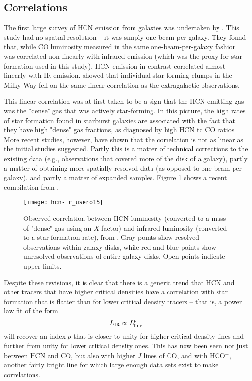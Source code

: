\subsection{Correlations}

The first large survey of HCN emission from galaxies was undertaken by \citet{gao04b, gao04a}. This study had no spatial resolution -- it was simply one beam per galaxy. They found that, while CO luminosity measured in the same one-beam-per-galaxy fashion was correlated non-linearly with infrared emission (which was the proxy for star formation used in this study), HCN emission in contrast correlated almost linearly with IR emission. \citet{wu05a} showed that individual star-forming clumps in the Milky Way fell on the same linear correlation as the extragalactic observations.

This linear correlation was at first taken to be a sign that the HCN-emitting gas was the "dense" gas that was actively star-forming. In this picture, the high rates of star formation found in starburst galaxies are associated with the fact that they have high "dense" gas fractions, as diagnosed by high HCN to CO ratios. More recent studies, however, have shown that the correlation is not as linear as the initial studies suggested. Partly this is a matter of technical corrections to the existing data (e.g., observations that covered more of the disk of a galaxy), partly a matter of obtaining more spatially-resolved data (as opposed to one beam per galaxy), and partly a matter of expanded samples. Figure \ref{fig:hcn-ir} shows a recent compilation from \citet{usero15a}.

\begin{figure}
\texttt{[image: hcn-ir\_usero15]}
\caption[Infrared-HCN luminosity correlation]{
\label{fig:hcn-ir}
Observed correlation between HCN luminosity (converted to a mass of "dense" gas using an $X$ factor) and infrared luminosity (converted to a star formation rate), from \citet{usero15a}. Gray points show resolved observations within galaxy disks, while red and blue points show unresolved observations of entire galaxy disks. Open points indicate upper limits.
}
\end{figure}

Despite these revisions, it is clear that there is a generic trend that HCN and other tracers that have higher critical densities have a correlation with star formation that is flatter than for lower critical density tracers -- that is, a power law fit of the form
\begin{equation}
L_{\rm IR} \propto L_{\rm line}^p
\end{equation}
will recover an index $p$ that is closer to unity for higher critical density lines and further from unity for lower critical density ones. This has now been seen not just between HCN and CO, but also with higher $J$ lines of CO, and with HCO$^+$, another fairly bright line for which large enough data sets exist to make correlations.

